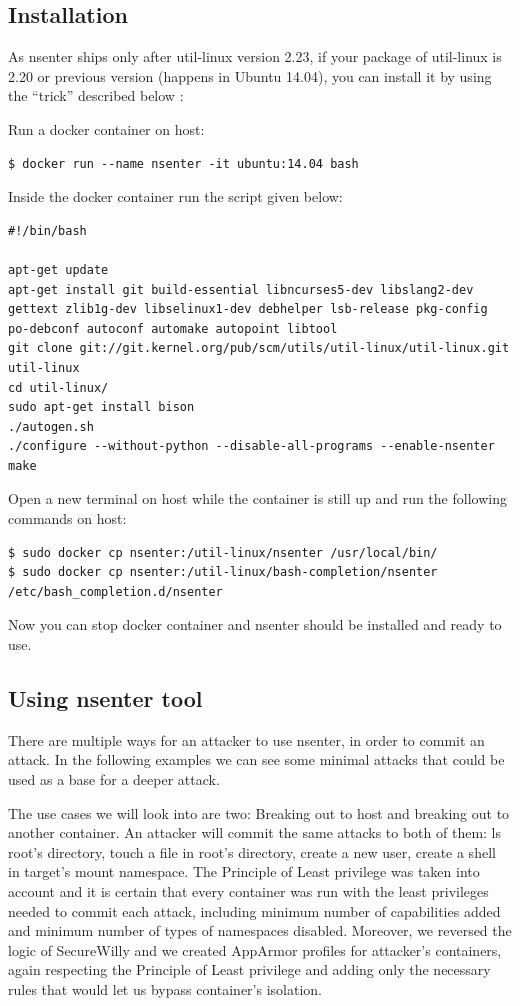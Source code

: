 \subsection{Installation}
As nsenter ships only after util-linux version 2.23, if your package of util-linux is 2.20 or previous version (happens in Ubuntu 14.04), you can install it by using the “trick” described below \cite{nsentertrick} :

Run a docker container on host:
\begin{lstlisting}[style=dockercommands]
$ docker run --name nsenter -it ubuntu:14.04 bash
\end{lstlisting}

Inside the docker container run the script given below:
\begin{lstlisting}[style=bashscript, caption={Script to run inside docker container nsenter}]
#!/bin/bash

apt-get update
apt-get install git build-essential libncurses5-dev libslang2-dev gettext zlib1g-dev libselinux1-dev debhelper lsb-release pkg-config po-debconf autoconf automake autopoint libtool
git clone git://git.kernel.org/pub/scm/utils/util-linux/util-linux.git util-linux
cd util-linux/
sudo apt-get install bison
./autogen.sh
./configure --without-python --disable-all-programs --enable-nsenter
make
\end{lstlisting}

Open a new terminal on host while the container is still up and run the following commands on host:

\begin{lstlisting}[style=terminal]
$ sudo docker cp nsenter:/util-linux/nsenter /usr/local/bin/
$ sudo docker cp nsenter:/util-linux/bash-completion/nsenter /etc/bash_completion.d/nsenter
\end{lstlisting}

Now you can stop docker container and nsenter should be installed and ready to use.

\subsection{Using nsenter tool} \label{nsattack}
There are multiple ways for an attacker to use nsenter, in order to commit an attack. In the following examples we can see some minimal attacks that could be used as a base for a deeper attack.

The use cases we will look into are two: Breaking out to host and breaking out to another container. An attacker will commit the same attacks to both of them: ls root's directory, touch a file in root's directory, create a new user, create a shell in target's mount namespace.
The Principle of Least privilege was taken into account and it is certain that every container was run with the least privileges needed to commit each attack, including minimum number of capabilities added and minimum number of types of namespaces disabled.
Moreover, we reversed the logic of SecureWilly and we created AppArmor profiles for attacker's containers, again respecting the Principle of Least privilege and adding only the necessary rules that would let us bypass container's isolation. 

